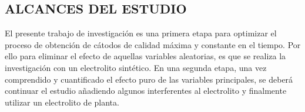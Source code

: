 \subsection{ALCANCES DEL ESTUDIO}
El presente trabajo de investigaci\'on es una primera etapa para optimizar el proceso de obtenci\'on de c\'atodos de calidad m\'axima y constante en el tiempo. Por ello para eliminar el efecto de aquellas variables aleatorias, es que se realiza la investigaci\'on con un electrolito sint\'etico. En una segunda etapa, una vez comprendido y cuantificado el efecto puro de las variables principales, se deber\'a continuar el estudio a\~nadiendo algunos interferentes al electrolito y finalmente utilizar un electrolito de planta. 
